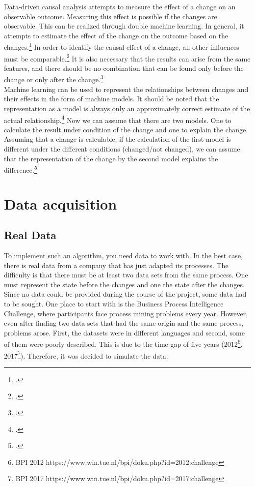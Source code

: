     Data-driven causal analysis attempts to measure the effect of a change on an observable outcome. Measuring this effect is possible if the changes are observable. This can be realized through double machine learning. In general, it attempts to estimate the effect of the change on the outcome based on the changes.\footcite[see][106]{mahu2020} In order to identify the causal effect of a change, all other influences must be comparable.\footcite[see][107]{mahu2020} It is also necessary that the results can arise from the same features, and there should be no combination that can be found only before the change or only after the change.\footcite[see][109]{mahu2020}\\
    Machine learning can be used to represent the relationships between changes and their effects in the form of machine models. It should be noted that the representation as a model is always only an approximately correct estimate of the actual relationship.\footcite[see][111]{mahu2020} Now we can assume that there are two models. One to calculate the result under condition of the change and one to explain the change. Assuming that a change is calculable, if the calculation of the first model is different under the different conditions (changed/not changed), we can assume that the representation of the change by the second model explains the difference.\footcite[see][112\psqq]{mahu2020}
\clearpage
\chapter{Data acquisition}

    \section{Real Data}
    To implement such an algorithm, you need data to work with. In the best case, there is real data from a company that has just adapted its processes. The difficulty is that there must be at least two data sets from the same process. One must represent the state before the changes and one the state after the changes.\\
    Since no data could be provided during the course of the project, some data had to be sought. One place to start with is the Business Process Intelligence Challenge, where participants face process mining problems every year. However, even after finding two data sets that had the same origin and the same process, problems arose. First, the datasets were in different languages and second, some of them were poorly described. This is due to the time gap of five years (2012\footnote{BPI 2012 https://www.win.tue.nl/bpi/doku.php?id=2012:challenge}, 2017\footnote{BPI 2017 https://www.win.tue.nl/bpi/doku.php?id=2017:challenge}). Therefore, it was decided to simulate the data.

